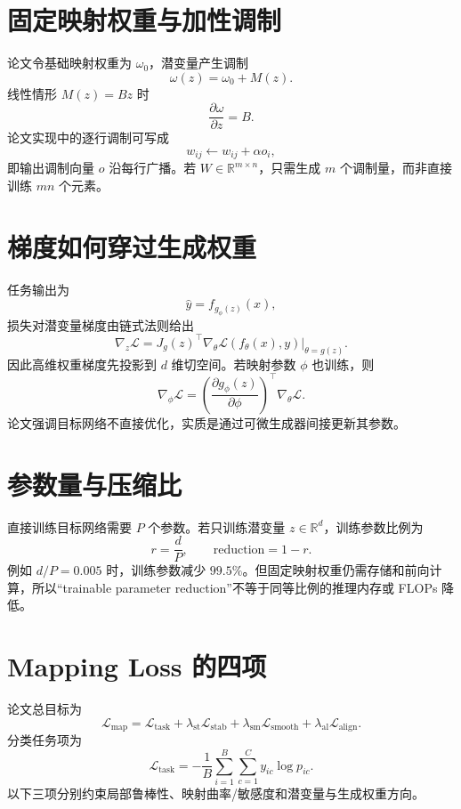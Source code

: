 \documentclass[UTF8,12pt,a4paper,fontset=none]{ctexart}
\numberwithin{equation}{section}
\newcommand{\R}{\mathbb{R}}
\newcommand{\Loss}{\mathcal{L}}
\begin{document}
\section{固定映射权重与加性调制}
论文令基础映射权重为 $\omega_0$，潜变量产生调制
\begin{equation}
 \omega(z)=\omega_0+M(z).
\end{equation}
线性情形 $M(z)=Bz$ 时
\begin{equation}
 \frac{\partial\omega}{\partial z}=B.
\end{equation}
论文实现中的逐行调制可写成
\begin{equation}
 w_{ij}\leftarrow w_{ij}+\alpha o_i,
\end{equation}
即输出调制向量 $o$ 沿每行广播。若 $W\in\R^{m\times n}$，只需生成 $m$ 个调制量，而非直接训练 $mn$ 个元素。

\section{梯度如何穿过生成权重}
任务输出为
\begin{equation}
 \widehat y=f_{g_\phi(z)}(x),
\end{equation}
损失对潜变量梯度由链式法则给出
\begin{equation}
 \boxed{
 \nabla_z\Loss
 =J_g(z)^\top\nabla_\theta\Loss(f_\theta(x),y)
 \big|_{\theta=g(z)}.
 }
\end{equation}
因此高维权重梯度先投影到 $d$ 维切空间。若映射参数 $\phi$ 也训练，则
\begin{equation}
 \nabla_\phi\Loss
 =\left(\frac{\partial g_\phi(z)}{\partial\phi}\right)^\top
 \nabla_\theta\Loss.
\end{equation}
论文强调目标网络不直接优化，实质是通过可微生成器间接更新其参数。

\section{参数量与压缩比}
直接训练目标网络需要 $P$ 个参数。若只训练潜变量 $z\in\R^d$，训练参数比例为
\begin{equation}
 r=\frac dP,
 \qquad
 \text{reduction}=1-r.
\end{equation}
例如 $d/P=0.005$ 时，训练参数减少 $99.5\%$。但固定映射权重仍需存储和前向计算，所以“trainable parameter reduction”不等于同等比例的推理内存或 FLOPs 降低。

\section{Mapping Loss 的四项}
论文总目标为
\begin{equation}
 \boxed{
 \Loss_{\mathrm{map}}
 =\Loss_{\mathrm{task}}
 +\lambda_{\mathrm{st}}\Loss_{\mathrm{stab}}
 +\lambda_{\mathrm{sm}}\Loss_{\mathrm{smooth}}
 +\lambda_{\mathrm{al}}\Loss_{\mathrm{align}}.
 }
\end{equation}
分类任务项为
\begin{equation}
 \Loss_{\mathrm{task}}
 =-\frac1B\sum_{i=1}^{B}\sum_{c=1}^{C}
 y_{ic}\log p_{ic}.
\end{equation}
以下三项分别约束局部鲁棒性、映射曲率/敏感度和潜变量与生成权重方向。
\end{document}
